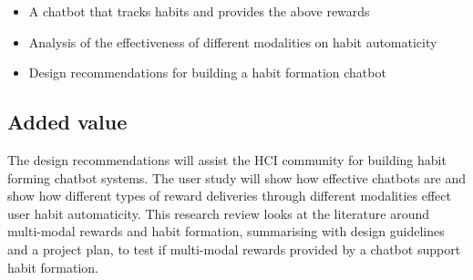 \begin{itemize}
  \item A chatbot that tracks habits and provides the above rewards
  \item Analysis of the effectiveness of different modalities on habit automaticity
  \item Design recommendations for building a habit formation chatbot
\end{itemize}

\subsection*{Added value}
The design recommendations will assist the HCI community for building habit forming chatbot systems. The user study will show how effective chatbots are and show how different types of reward deliveries through different modalities effect user habit automaticity.\newline
\newline
This research review looks at the literature around multi-modal rewards and habit formation, summarising with design guidelines and a project plan, to test if multi-modal rewards provided by a chatbot support habit formation.

\newpage

